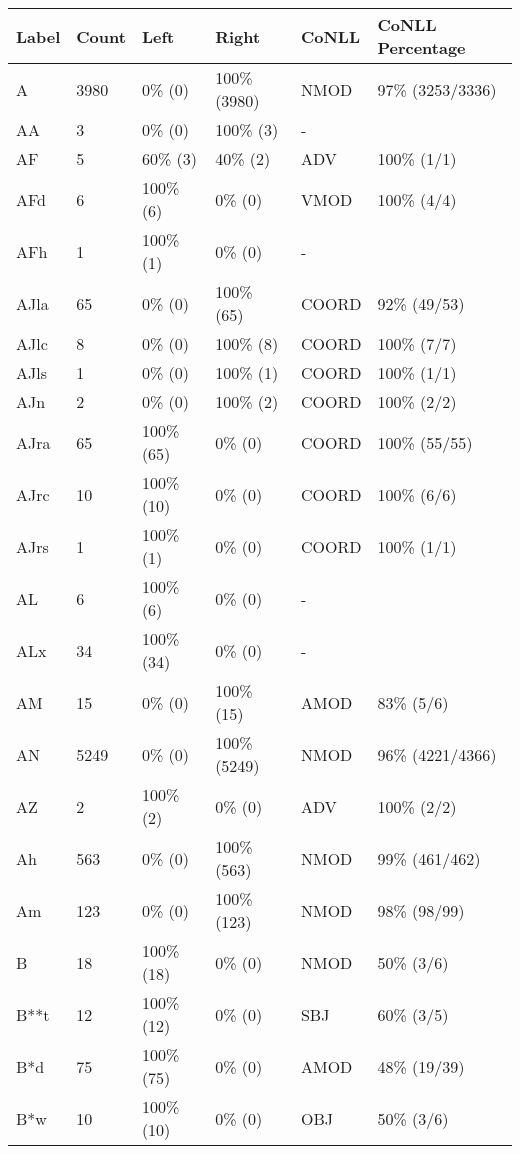 \begin{figure*}
\begin{tabular}{|l|l|l|l||l|l|}
\hline
Label & Count & Left & Right & CoNLL & CoNLL Percentage\\ 
\hline
 A & 3980 & 0\% (0) & 100\% (3980) & NMOD & 97\% (3253/3336) \\ 
\hline
 AA & 3 & 0\% (0) & 100\% (3) & - &  \\ 
\hline
 AF & 5 & 60\% (3) & 40\% (2) & ADV & 100\% (1/1) \\ 
\hline
 AFd & 6 & 100\% (6) & 0\% (0) & VMOD & 100\% (4/4) \\ 
\hline
 AFh & 1 & 100\% (1) & 0\% (0) & - &  \\ 
\hline
 AJla & 65 & 0\% (0) & 100\% (65) & COORD & 92\% (49/53) \\ 
\hline
 AJlc & 8 & 0\% (0) & 100\% (8) & COORD & 100\% (7/7) \\ 
\hline
 AJls & 1 & 0\% (0) & 100\% (1) & COORD & 100\% (1/1) \\ 
\hline
 AJn & 2 & 0\% (0) & 100\% (2) & COORD & 100\% (2/2) \\ 
\hline
 AJra & 65 & 100\% (65) & 0\% (0) & COORD & 100\% (55/55) \\ 
\hline
 AJrc & 10 & 100\% (10) & 0\% (0) & COORD & 100\% (6/6) \\ 
\hline
 AJrs & 1 & 100\% (1) & 0\% (0) & COORD & 100\% (1/1) \\ 
\hline
 AL & 6 & 100\% (6) & 0\% (0) & - &  \\ 
\hline
 ALx & 34 & 100\% (34) & 0\% (0) & - &  \\ 
\hline
 AM & 15 & 0\% (0) & 100\% (15) & AMOD & 83\% (5/6) \\ 
\hline
 AN & 5249 & 0\% (0) & 100\% (5249) & NMOD & 96\% (4221/4366) \\ 
\hline
 AZ & 2 & 100\% (2) & 0\% (0) & ADV & 100\% (2/2) \\ 
\hline
 Ah & 563 & 0\% (0) & 100\% (563) & NMOD & 99\% (461/462) \\ 
\hline
 Am & 123 & 0\% (0) & 100\% (123) & NMOD & 98\% (98/99) \\ 
\hline
 B & 18 & 100\% (18) & 0\% (0) & NMOD & 50\% (3/6) \\ 
\hline
 B**t & 12 & 100\% (12) & 0\% (0) & SBJ & 60\% (3/5) \\ 
\hline
 B*d & 75 & 100\% (75) & 0\% (0) & AMOD & 48\% (19/39) \\ 
\hline
 B*w & 10 & 100\% (10) & 0\% (0) & OBJ & 50\% (3/6) \\ 
\hline

\end{tabular}
\end{figure*}
